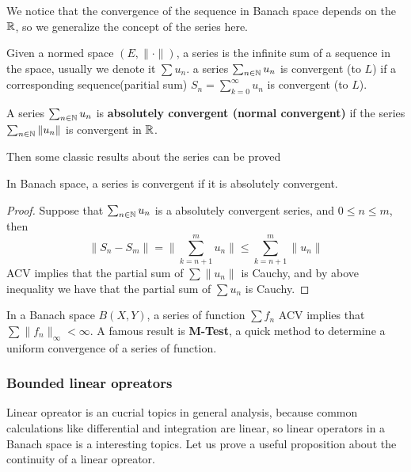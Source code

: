 \documentclass[en,hazy,blue,normal,12pt]{elegantnote}
\begin{document}
We notice that the convergence of the sequence in Banach space depends on the \(\mathbb{R}\), so we generalize the concept of the series here.
\begin{definition}[Series] 
    Given a normed space \((E,\|\cdot\|)\), a series is the infinite sum of a sequence in the space, usually we denote it \(\sum u_n\). a series \(\sum_{n \in \mathbb{N}}u_n\) is convergent (to \(L\)) if a corresponding sequence(paritial sum) \(S_n= \sum_{k=0}^{\infty}u_n\) is convergent (to \(L\)).

    A series \(\sum_{n \in \mathbb{N}}u_n\) is \textbf{absolutely convergent (normal convergent)} if the series \(\sum_{n \in \mathbb{N}}\|u_n\|\) is convergent in \(\mathbb{R}\).
    
\end{definition}

Then some classic results about the series can be proved

\begin{proposition}
    In Banach space, a series is convergent if it is absolutely convergent.
    
    \begin{proof}
        Suppose that \(\sum_{n \in \mathbb{N}}u_n\) is a absolutely convergent series, and \(0 \leq n \leq m \), then 
        \[\|S_n-S_m\| = \|\sum_{k=n+1}^{m}u_n\| \leq \sum_{k=n+1}^{m}\|u_n\|\]
        ACV implies that the partial sum of \(\sum\|u_n\|\) is Cauchy, and by above inequality we have that the partial sum of \(\sum u_n\) is Cauchy.
    \end{proof}
\end{proposition}


\begin{proposition}
    
\end{proposition}

\begin{remark}
    In a Banach space \(B(X,Y)\), a series of function \(\sum f_n\) ACV implies that \(\sum\|f_n\|_{\infty} < \infty\). A famous result is \textbf{M-Test}, a quick method to determine a uniform convergence of a series of function.
\end{remark}

\subsubsection{Bounded linear opreators}

Linear opreator is an cucrial topics in general analysis, because common calculations like differential and integration are linear, so linear operators in a Banach space is a interesting topics. Let us prove a useful proposition about the continuity of a linear opreator.
\end{document}
